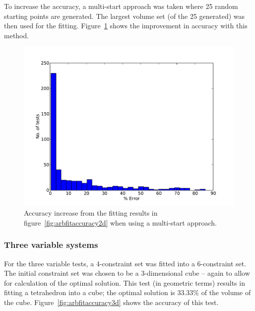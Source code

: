 To increase the accuracy, a multi-start approach was taken where 25 random starting points are generated.
The largest volume set (of the 25 generated) was then used for the fitting.
Figure~\ref{fig:arbfitaccuracy2dmulti} shows the improvement in accuracy with this method.

\begin{figure}[htbp]
  \centering
    \includegraphics[width=\fullwidth]{graph/arbfitaccuracy2d.pdf}
  \caption[Accuracy of constraint set fitting for 2 variables (multi-start)]{Accuracy increase from the fitting results in figure~\ref{fig:arbfitaccuracy2d} when using a multi-start approach.}
  \label{fig:arbfitaccuracy2dmulti}
\end{figure}

\subsubsection{Three variable systems}
For the three variable tests, a 4-constraint set was fitted into a 6-constraint set.
The initial constraint set was chosen to be a 3-dimensional cube -- again to allow for calculation of the optimal solution.
This test (in geometric terms) results in fitting a tetrahedron into a cube; the optimal solution is 33.33\% of the volume of the cube.
Figure~\ref{fig:arbfitaccuracy3d} shows the accuracy of this test.


